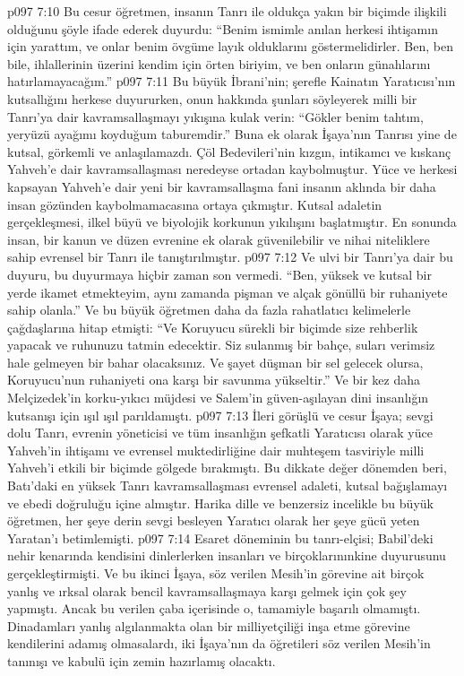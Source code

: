 \vs p097 7:10 Bu cesur öğretmen, insanın Tanrı ile oldukça yakın bir biçimde ilişkili olduğunu şöyle ifade ederek duyurdu: “Benim ismimle anılan herkesi ihtişamın için yarattım, ve onlar benim övgüme layık olduklarını göstermelidirler. Ben, ben bile, ihlallerinin üzerini kendim için örten biriyim, ve ben onların günahlarını hatırlamayacağım.”
\vs p097 7:11 Bu büyük İbrani’nin; şerefle Kainatın Yaratıcısı’nın kutsallığını herkese duyururken, onun hakkında şunları söyleyerek milli bir Tanrı’ya dair kavramsallaşmayı yıkışına kulak verin: “Gökler benim tahtım, yeryüzü ayağımı koyduğum taburemdir.” Buna ek olarak İşaya’nın Tanrısı yine de kutsal, görkemli ve anlaşılamazdı. Çöl Bedevileri’nin kızgın, intikamcı ve kıskanç Yahveh’e dair kavramsallaşması neredeyse ortadan kaybolmuştur. Yüce ve herkesi kapsayan Yahveh’e dair yeni bir kavramsallaşma fani insanın aklında bir daha insan gözünden kaybolmamacasına ortaya çıkmıştır. Kutsal adaletin gerçekleşmesi, ilkel büyü ve biyolojik korkunun yıkılışını başlatmıştır. En sonunda insan, bir kanun ve düzen evrenine ek olarak güvenilebilir ve nihai niteliklere sahip evrensel bir Tanrı ile tanıştırılmıştır.
\vs p097 7:12 Ve ulvi bir Tanrı’ya dair bu duyuru, bu  duyurmaya hiçbir zaman son vermedi. “Ben, yüksek ve kutsal bir yerde ikamet etmekteyim, aynı zamanda pişman ve alçak gönüllü bir ruhaniyete sahip olanla.” Ve bu büyük öğretmen daha da fazla rahatlatıcı kelimelerle çağdaşlarına hitap etmişti: “Ve Koruyucu sürekli bir biçimde size rehberlik yapacak ve ruhunuzu tatmin edecektir. Siz sulanmış bir bahçe, suları verimsiz hale gelmeyen bir bahar olacaksınız. Ve şayet düşman bir sel gelecek olursa, Koruyucu’nun ruhaniyeti ona karşı bir savunma yükseltir.” Ve bir kez daha Melçizedek’in korku\hyp{}yıkıcı müjdesi ve Salem’in güven\hyp{}aşılayan dini insanlığın kutsanışı için ışıl ışıl parıldamıştı.
\vs p097 7:13 İleri görüşlü ve cesur İşaya; sevgi dolu Tanrı, evrenin yöneticisi ve tüm insanlığın şefkatli Yaratıcısı olarak yüce Yahveh’in ihtişamı ve evrensel muktedirliğine dair muhteşem tasviriyle milli Yahveh’i etkili bir biçimde gölgede bırakmıştı. Bu dikkate değer dönemden beri, Batı’daki en yüksek Tanrı kavramsallaşması evrensel adaleti, kutsal bağışlamayı ve ebedi doğruluğu içine almıştır. Harika dille ve benzersiz incelikle bu büyük öğretmen, her şeye derin sevgi besleyen Yaratıcı olarak her şeye gücü yeten Yaratan’ı betimlemişti.
\vs p097 7:14 Esaret döneminin bu tanrı\hyp{}elçisi; Babil’deki nehir kenarında kendisini dinlerlerken insanları ve birçoklarınınkine duyurusunu gerçekleştirmişti. Ve bu ikinci İşaya, söz verilen Mesih’in görevine ait birçok yanlış ve ırksal olarak bencil kavramsallaşmaya karşı gelmek için çok şey yapmıştı. Ancak bu verilen çaba içerisinde o, tamamiyle başarılı olmamıştı. Dinadamları yanlış algılanmakta olan bir milliyetçiliği inşa etme görevine kendilerini adamış olmasalardı, iki İşaya’nın da öğretileri söz verilen Mesih’in tanınışı ve kabulü için zemin hazırlamış olacaktı.
